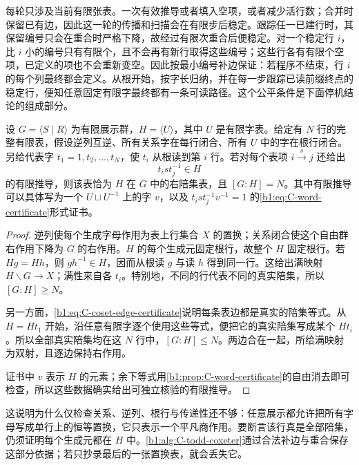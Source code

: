 每轮只涉及当前有限张表。一次有效推导或者填入空项，或者减少活行数；合并时保留已有边，因此这一轮的传播和扫描会在有限步后稳定。跟踪任一已建行时，其保留编号只会在重合时严格下降，故经过有限次重合后便稳定。对一个稳定行 \(i\)，比 \(i\) 小的编号只有有限个，且不会再有新行取得这些编号；这些行各有有限个空项，已定义的项也不会重新变空。因此按最小编号补边保证：若程序不结束，行 \(i\) 的每个列最终都会定义。从根开始，按字长归纳，并在每一步跟踪已读前缀终点的稳定行，便知任意固定有限字最终都有一条可读路径。这个公平条件是下面停机结论的组成部分。

\begin{proposition}\label{b1:prop:C-coset-certificate}
	设 \(G=\langle S\mid R\rangle\) 为有限展示群，\(H=\langle U\rangle\)，其中 \(U\) 是有限字表。给定有 \(N\) 行的完整有限表，假设逆列互逆、所有关系字在每行闭合、所有 \(U\) 中的字在根行闭合。另给代表字 \(t_1=1,t_2,\ldots,t_N\)，使 \(t_i\) 从根读到第 \(i\) 行。若对每个表项 \(i\xrightarrow{s}j\) 还给出
	\begin{equation}\label{b1:eq:C-coset-edge-certificate}
		t_i s t_j^{-1}\in H
	\end{equation}
	的有限推导，则该表恰为 \(H\) 在 \(G\) 中的右陪集表，且 \([G:H]=N\)。其中有限推导可以具体写为一个 \(U\sqcup U^{-1}\) 上的字 \(v\)，以及 \(t_i s t_j^{-1}v^{-1}=1\) 的\eqref{b1:eq:C-word-certificate}形式证书。
\end{proposition}

\begin{proof}
	逆列使每个生成字母作用为表上行集合 \(X\) 的置换；关系闭合使这个自由群右作用下降为 \(G\) 的右作用。\(H\) 的每个生成元固定根行，故整个 \(H\) 固定根行。若 \(Hg=Hh\)，则 \(gh^{-1}\in H\)，因而从根读 \(g\) 与读 \(h\) 得到同一行。这给出满映射 \(H\backslash G\to X\)；满性来自各 \(t_i\)。特别地，不同的行代表不同的真实陪集，所以 \([G:H]\geq N\)。

	另一方面，\eqref{b1:eq:C-coset-edge-certificate}说明每条表边都是真实的陪集等式。从 \(H=Ht_1\) 开始，沿任意有限字逐个使用这些等式，便把它的真实陪集写成某个 \(Ht_i\)。所以全部真实陪集均在这 \(N\) 行中，\([G:H]\leq N\)。两边合在一起，所给满映射为双射，且逐边保持右作用。

	证书中 \(v\) 表示 \(H\) 的元素；余下等式用\cref{b1:prop:C-word-certificate}的自由消去即可检查，所以这些数据确实给出可独立核验的有限推导。
\end{proof}

这说明为什么仅检查关系、逆列、根行与传递性还不够：任意展示都允许把所有字母写成单行上的恒等置换，它只表示一个平凡商作用。要断言该行真是全部陪集，仍须证明每个生成元都在 \(H\) 中。\cref{b1:alg:C-todd-coxeter}通过合法补边与重合保存这部分依据；若只抄录最后的一张置换表，就会丢失它。

